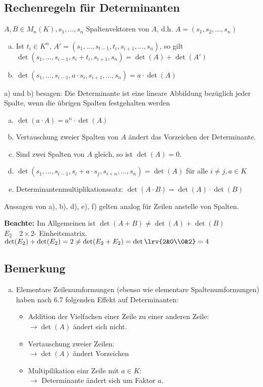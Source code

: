 \subsection{Rechenregeln für Determinanten}
  $A,B\in M_n(K),s_1,...,s_n$ Spaltenvektoren von $A$, d.h. $A=(s_1,s_2,...,s_n)$
  \begin{enumerate}[a)]
    \item Ist $t_i\in K^n$, $A'=(s_1,...,s_{t-1},t_i,s_{i+1},...,s_n)$, so gilt
      $\det(s_1,...,s_{i-1},s_i+t_i,s_{i+1},s_n)=\det(A)+\det(A')$
    \item $\det(s_1,...,s_{i-1},a\cdot s_i,s_{i+1},...,s_n)=a\cdot\det(A)$
  \end{enumerate}
  a) und b) besagen: Die Determinante ist eine lineare Abbildung bezüglich
  jeder Spalte, wenn die übrigen Spalten festgehalten werden
  \begin{enumerate}[c)]
    \item $\det(a\cdot A)=a^n\cdot\det(A)$
    \item Vertauschung zweier Spalten von $A$ ändert das Vorzeichen der
      Determinante.
    \item Sind zwei Spalten von $A$ gleich, so ist $\det(A)=0$.
    \item $\det(s_1,...,s_{i-1},s_i+a\cdot s_j,s_{i+n},...,s_n)=\det(A)$ für
      alle $i\neq j,a\in K$
    \item Determinantenmultiplikationssatz: $\det(A\cdot
      B)=\det(A)\cdot\det(B)$
  \end{enumerate}

  Aussagen von a), b), d), e), f) gelten analog für Zeilen anstelle von
  Spalten.

  \textbf{Beachte:} Im Allgemeinen ist $\det(A+B)\neq\det(A)+\det(B)$\\

  $E_2\quad 2\times 2$- Einheitsmatrix.\\
  $\det(E_2)+\det(E_2)=2\neq\det(E_2+E_2)=\det\lrv{2&0\\0&2}=4$

\subsection{Bemerkung}
  \begin{enumerate}[a)]
    \item Elementare Zeilenumformungen (ebenso wie elementare
      Spaltenumformungen) haben nach 6.7 folgenden Effekt auf Determinanten:
      \begin{itemize}[-]
        \item Addition der Vielfachen einer Zeile zu einer anderen Zeile:\\
          $\rightarrow\det(A)$ ändert sich nicht.
        \item Vertauschung zweier Zeilen:\\
          $\rightarrow\det(A)$ ändert Vorzeichen
        \item Multipilikation einr Zeile mit $a\in K$:\\
          $\rightarrow$ Determinante ändert sich um Faktor $a$.
      \end{itemize}
  \end{enumerate}
